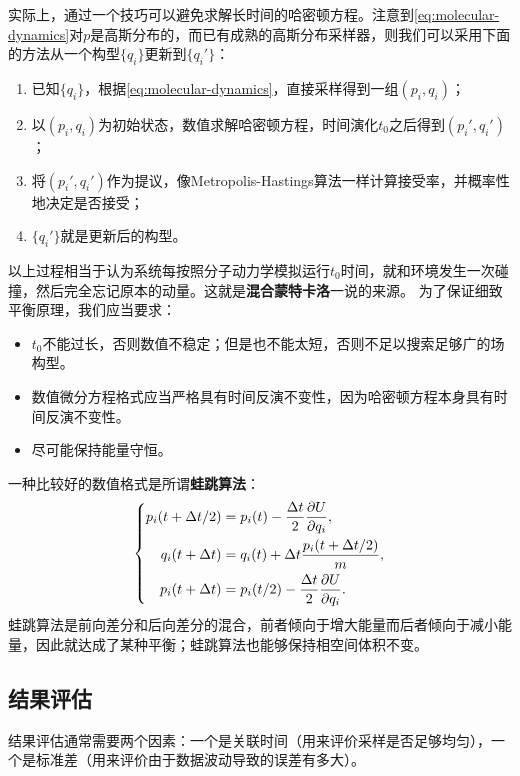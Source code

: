 \documentclass[hyperref, UTF8, a4paper]{ctexart}
\newcommand*{\concept}[1]{{\textbf{#1}}}
\begin{document}
实际上，通过一个技巧可以避免求解长时间的哈密顿方程。注意到\eqref{eq:molecular-dynamics}对$p$是高斯分布的，而已有成熟的高斯分布采样器，则我们可以采用下面的方法从一个构型$\{q_i\}$更新到$\{q_i'\}$：
\begin{enumerate}
    \item 已知$\{q_i\}$，根据\eqref{eq:molecular-dynamics}，直接采样得到一组$(p_i, q_i)$；
    \item 以$(p_i, q_i)$为初始状态，数值求解哈密顿方程，时间演化$t_0$之后得到$(p_i', q_i')$；
    \item 将$(p_i', q_i')$作为提议，像Metropolis-Hastings算法一样计算接受率，并概率性地决定是否接受；
    \item $\{q_i'\}$就是更新后的构型。
\end{enumerate}
以上过程相当于认为系统每按照分子动力学模拟运行$t_0$时间，就和环境发生一次碰撞，然后完全忘记原本的动量。这就是\concept{混合蒙特卡洛}一说的来源。
为了保证细致平衡原理，我们应当要求：
\begin{itemize}
    \item $t_0$不能过长，否则数值不稳定；但是也不能太短，否则不足以搜索足够广的场构型。
    \item 数值微分方程格式应当严格具有时间反演不变性，因为哈密顿方程本身具有时间反演不变性。
    \item 尽可能保持能量守恒。
\end{itemize}
一种比较好的数值格式是所谓\concept{蛙跳算法}：
\begin{equation}
    \left\{
        \begin{aligned}
            p_i(t + \Delta t / 2) &= p_i(t) - \frac{\Delta t}{2} \pdv{U}{q_i} (t), \\
            q_i(t + \Delta t) &= q_i(t) + \Delta t \frac{p_i(t + \Delta t / 2)}{m}, \\
            p_i(t + \Delta t) &= p_i(t / 2) - \frac{\Delta t}{2} \pdv{U}{q_i} (t + \Delta t).
        \end{aligned}
    \right.
\end{equation}
蛙跳算法是前向差分和后向差分的混合，前者倾向于增大能量而后者倾向于减小能量，因此就达成了某种平衡；蛙跳算法也能够保持相空间体积不变。

\subsection{结果评估}

结果评估通常需要两个因素：一个是关联时间（用来评价采样是否足够均匀），一个是标准差（用来评价由于数据波动导致的误差有多大）。
\end{document}
